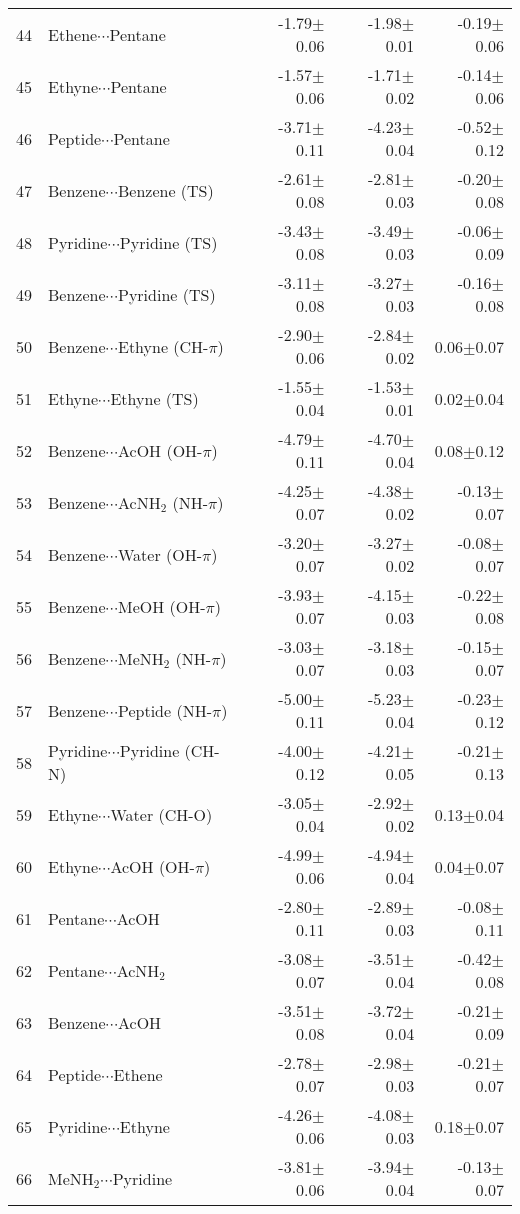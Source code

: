 \begin{longtable}{llrrr}
44 & Ethene$\cdots$Pentane & -1.79$\pm$0.06 & -1.98$\pm$0.01 & -0.19$\pm$0.06  \\
45 & Ethyne$\cdots$Pentane & -1.57$\pm$0.06 & -1.71$\pm$0.02 & -0.14$\pm$0.06  \\
46 & Peptide$\cdots$Pentane & -3.71$\pm$0.11 & -4.23$\pm$0.04 & -0.52$\pm$0.12  \\
47 & Benzene$\cdots$Benzene (TS) & -2.61$\pm$0.08 & -2.81$\pm$0.03 & -0.20$\pm$0.08  \\
48 & Pyridine$\cdots$Pyridine (TS) & -3.43$\pm$0.08 & -3.49$\pm$0.03 & -0.06$\pm$0.09  \\
49 & Benzene$\cdots$Pyridine (TS) & -3.11$\pm$0.08 & -3.27$\pm$0.03 & -0.16$\pm$0.08  \\
50 & Benzene$\cdots$Ethyne (CH-$\pi$) & -2.90$\pm$0.06 & -2.84$\pm$0.02 & 0.06$\pm$0.07  \\
51 & Ethyne$\cdots$Ethyne (TS) & -1.55$\pm$0.04 & -1.53$\pm$0.01 & 0.02$\pm$0.04  \\
52 & Benzene$\cdots$AcOH (OH-$\pi$) & -4.79$\pm$0.11 & -4.70$\pm$0.04 & 0.08$\pm$0.12  \\
53 & Benzene$\cdots$AcNH$_2$ (NH-$\pi$) & -4.25$\pm$0.07 & -4.38$\pm$0.02 & -0.13$\pm$0.07  \\
54 & Benzene$\cdots$Water (OH-$\pi$) & -3.20$\pm$0.07 & -3.27$\pm$0.02 & -0.08$\pm$0.07  \\
55 & Benzene$\cdots$MeOH (OH-$\pi$) & -3.93$\pm$0.07 & -4.15$\pm$0.03 & -0.22$\pm$0.08  \\
56 & Benzene$\cdots$MeNH$_2$ (NH-$\pi$) & -3.03$\pm$0.07 & -3.18$\pm$0.03 & -0.15$\pm$0.07  \\
57 & Benzene$\cdots$Peptide (NH-$\pi$) & -5.00$\pm$0.11 & -5.23$\pm$0.04 & -0.23$\pm$0.12  \\
58 & Pyridine$\cdots$Pyridine (CH-N) & -4.00$\pm$0.12 & -4.21$\pm$0.05 & -0.21$\pm$0.13  \\
59 & Ethyne$\cdots$Water (CH-O) & -3.05$\pm$0.04 & -2.92$\pm$0.02 & 0.13$\pm$0.04  \\
60 & Ethyne$\cdots$AcOH (OH-$\pi$) & -4.99$\pm$0.06 & -4.94$\pm$0.04 & 0.04$\pm$0.07  \\
61 & Pentane$\cdots$AcOH & -2.80$\pm$0.11 & -2.89$\pm$0.03 & -0.08$\pm$0.11  \\
62 & Pentane$\cdots$AcNH$_2$ & -3.08$\pm$0.07 & -3.51$\pm$0.04 & -0.42$\pm$0.08  \\
63 & Benzene$\cdots$AcOH & -3.51$\pm$0.08 & -3.72$\pm$0.04 & -0.21$\pm$0.09  \\
64 & Peptide$\cdots$Ethene & -2.78$\pm$0.07 & -2.98$\pm$0.03 & -0.21$\pm$0.07  \\
65 & Pyridine$\cdots$Ethyne & -4.26$\pm$0.06 & -4.08$\pm$0.03 & 0.18$\pm$0.07  \\
66 & MeNH$_2$$\cdots$Pyridine & -3.81$\pm$0.06 & -3.94$\pm$0.04 & -0.13$\pm$0.07  \\
\end{longtable}